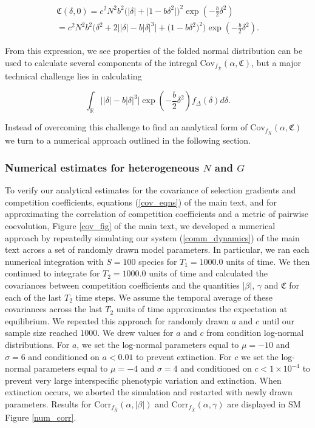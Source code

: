 \documentclass[]{article}
\begin{document}
\begin{multline}
\mathfrak{C}(\delta,0)=c^2N^2b^2\Big(|\delta|+\big|1-b\delta^2\big|\Big)^2\exp\left(-\frac{b}{2}\delta^2\right) \\
=c^2N^2b^2\Big(\delta^2+2\big||\delta|-b|\delta|^3\big|+\big(1-b\delta^2\big)^2\Big)\exp\left(-\frac{b}{2}\delta^2\right).
\end{multline}

From this expression, we see properties of the folded normal
distribution can be used to calculate several components of the intregal
\(\mathrm{Cov}_{f_{\bar X}}(\alpha,\mathfrak{C})\), but a major
technical challenge lies in calculating

\begin{equation}
\int_{\mathbb{R}}\big||\delta|-b|\delta|^3\big|\exp\left(-\frac{b}{2}\delta^2\right)f_{\Delta}(\delta)d\delta.
\end{equation}

Instead of overcoming this challenge to find an analytical form of
\(\mathrm{Cov}_{f_{\bar X}}(\alpha,\mathfrak{C})\) we turn to a
numerical approach outlined in the following section.

\hypertarget{numerical-estimates-for-heterogeneous-n-and-g}{%
\subsubsection{\texorpdfstring{Numerical estimates for heterogeneous
\(N\) and
\(G\)}{Numerical estimates for heterogeneous N and G}}\label{numerical-estimates-for-heterogeneous-n-and-g}}

To verify our analytical estimates for the covariance of selection
gradients and competition coefficients, equations (\ref{cov_eqns}) of
the main text, and for approximating the correlation of competition
coefficients and a metric of pairwise coevolution, Figure \ref{cov_fig}
of the main text, we developed a numerical approach by repeatedly
simulating our system (\ref{comm_dynamics}) of the main text across a
set of randomly drawn model parameters. In particular, we ran each
numerical integration with \(S=100\) species for \(T_1=1000.0\) units of
time. We then continued to integrate for \(T_2=1000.0\) units of time
and calculated the covariances between competition coefficients and the
quantities \(|\beta|\), \(\gamma\) and \(\mathfrak{C}\) for each of the
last \(T_2\) time steps. We assume the temporal average of these
covariances across the last \(T_2\) units of time approximates the
expectation at equilibrium. We repeated this approach for randomly drawn
\(a\) and \(c\) until our sample size reached \(1000\). We drew values
for \(a\) and \(c\) from condition log-normal distributions. For \(a\),
we set the log-normal parameters equal to \(\mu=-10\) and \(\sigma=6\)
and conditioned on \(a<0.01\) to prevent extinction. For \(c\) we set
the log-normal parameters equal to \(\mu=-4\) and \(\sigma=4\) and
conditioned on \(c<1\times 10^{-4}\) to prevent very large interspecific
phenotypic variation and extinction. When extinction occurs, we aborted
the simulation and restarted with newly drawn parameters. Results for
\(\mathrm{Corr}_{f_{\bar X}}(\alpha,|\beta|)\) and
\(\mathrm{Corr}_{f_{\bar X}}(\alpha,\gamma)\) are displayed in SM Figure
\ref{num_corr}.
\end{document}
